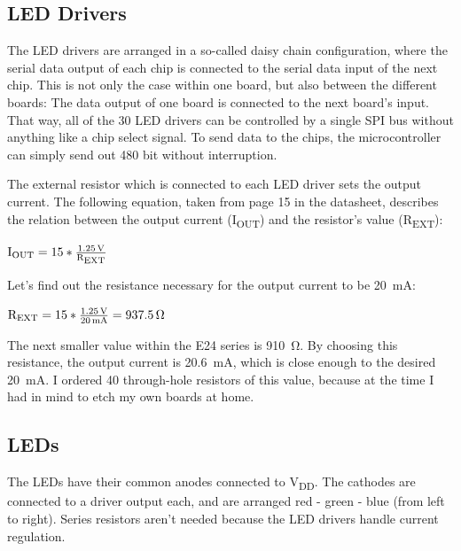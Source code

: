 \documentclass[a4paper, 11pt, titlepage]{report}
\def \vdd {V\textsubscript{DD}}
\newenvironment{ownmath}
{\vspace{2mm}\hspace{15pt}\begin{math}}
{\end{math}\vspace{2mm}}
\begin{document}
\subsection{LED Drivers}

The LED drivers are arranged in a so-called daisy chain configuration, where the serial data output
of each chip is connected to the serial data input of the next chip. This is not only the case 
within one board, but also between the different boards: The data output of one board is connected
to the next board's input. That way, all of the 30 LED drivers can be controlled by a single SPI
bus without anything like a chip select signal. To send data to the chips, the microcontroller 
can simply send out 480 bit without interruption.

\def \iout {I\textsubscript{OUT}}
\def \rext {R\textsubscript{EXT}}

The external resistor which is connected to each LED driver sets the output
current. The following equation, taken from page 15 in the datasheet, describes the relation
between the output current (\iout) and the resistor's value (\rext):

\begin{ownmath}
\textrm{\iout} = 15 * \frac{\SI{1.25}{\volt}}{\si{\rext}}
\end{ownmath}

Let's find out the resistance necessary for the output current to be \SI{20}{\milli\ampere}:

\begin{ownmath}
\textrm{\rext} = 15 * \frac{\SI{1.25}{\volt}}{\SI{20}{\milli\ampere}} = \SI{937.5}{\ohm}
\end{ownmath}

The next smaller value within the E24 series is \SI{910}{\ohm}. By choosing this resistance, the 
output current is \SI{20.6}{\milli\ampere}, which is close enough to the desired 
\SI{20}{\milli\ampere}. I ordered 40 through-hole resistors of this value, because at the time I
had in mind to etch my own boards at home.


\subsection{LEDs}

The LEDs have their common anodes connected to \vdd. The cathodes are connected to a driver output
each, and are arranged red - green - blue (from left to right). Series resistors aren't needed 
because the LED drivers handle current regulation.
\end{document}
